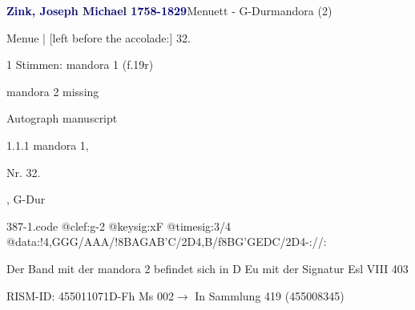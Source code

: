 \documentclass[twocolumn]{book}
\begin{document}
\par \vspace{7pt} \textcolor{darkblue}{\textbf{Zink, Joseph Michael  1758-1829}}\hfillplus{\textbf{[387]}}\newline Menuett - G-Dur\newline mandora (2)
\par \begin{itshape}[f.19r, at left:] Menue | [left before the accolade:] 32.\end{itshape} 
\par \textcolor{darkblue}{}  1 Stimmen: mandora 1  (f.19r)\newline \begin{small} mandora 2 missing\end{small} \newline Autograph manuscript
\par 1.1.1  mandora 1, \begin{itshape}Nr. 32.\end{itshape}, G-Dur  
\begin{filecontents*}{387-1.code}
@clef:g-2
@keysig:xF
@timesig:3/4
@data:!4,GGG/AAA/!8BAGAB'C/2D4,B/f8BG'GEDC/2D4-://:
\end{filecontents*}
\newline
%
\par Der Band mit der mandora 2 befindet sich in D Eu mit der Signatur Esl VIII 403
\par RISM-ID: 455011071\newline D-Fh  Ms 002\newline $\rightarrow$ In Sammlung 419 (455008345)
      
\end{document}
